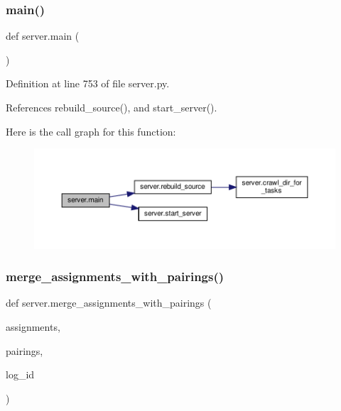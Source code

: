 \subsubsection{\texorpdfstring{main()}{main()}}
{\footnotesize\ttfamily def server.\+main (\begin{DoxyParamCaption}{ }\end{DoxyParamCaption})}



Definition at line 753 of file server.\+py.



References rebuild\+\_\+source(), and start\+\_\+server().

Here is the call graph for this function\+:
\nopagebreak
\begin{figure}[H]
\begin{center}
\leavevmode
\includegraphics[width=350pt]{namespaceserver_a6d1c10ed8aa5d27e61ed9db6b4274261_cgraph}
\end{center}
\end{figure}
\mbox{\label{namespaceserver_a30d7f5eb7c84bbe9bc4c3100bd3be229}} 
\subsubsection{\texorpdfstring{merge\+\_\+assignments\+\_\+with\+\_\+pairings()}{merge\_assignments\_with\_pairings()}}
{\footnotesize\ttfamily def server.\+merge\+\_\+assignments\+\_\+with\+\_\+pairings (\begin{DoxyParamCaption}\item[{}]{assignments,  }\item[{}]{pairings,  }\item[{}]{log\+\_\+id }\end{DoxyParamCaption})}




